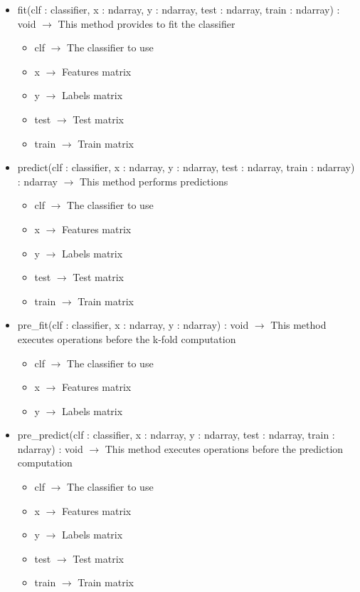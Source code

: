 \begin{description}
\begin{itemize}
\item fit(clf : classifier, x : ndarray, y : ndarray, test : ndarray, train : ndarray) : void $\rightarrow$ This method provides to fit the classifier\begin{itemize}
\item clf $\rightarrow$ The classifier to use
\item x $\rightarrow$ Features matrix
\item y $\rightarrow$ Labels matrix
\item test $\rightarrow$ Test matrix
\item train $\rightarrow$ Train matrix
\end{itemize}

\item predict(clf : classifier, x : ndarray, y : ndarray, test : ndarray, train : ndarray) : ndarray $\rightarrow$ This method performs predictions\begin{itemize}
\item clf $\rightarrow$ The classifier to use
\item x $\rightarrow$ Features matrix
\item y $\rightarrow$ Labels matrix
\item test $\rightarrow$ Test matrix
\item train $\rightarrow$ Train matrix
\end{itemize}

\item pre\_fit(clf : classifier, x : ndarray, y : ndarray) : void $\rightarrow$ This method executes operations before the k-fold computation\begin{itemize}
\item clf $\rightarrow$ The classifier to use
\item x $\rightarrow$ Features matrix
\item y $\rightarrow$ Labels matrix
\end{itemize}

\item pre\_predict(clf : classifier, x : ndarray, y : ndarray, test : ndarray, train : ndarray) : void $\rightarrow$ This method executes operations before the prediction computation\begin{itemize}
\item clf $\rightarrow$ The classifier to use
\item x $\rightarrow$ Features matrix
\item y $\rightarrow$ Labels matrix
\item test $\rightarrow$ Test matrix
\item train $\rightarrow$ Train matrix
\end{itemize}


\end{itemize}
\end{description}
